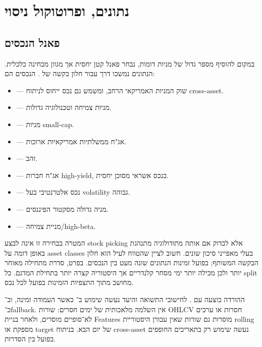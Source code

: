 \section{נתונים,  ופרוטוקול ניסוי}

\subsection{פאנל הנכסים}

במקום להוסיף מספר גדול של מניות דומות, נבחר פאנל קטן יחסית אך מגוון מבחינה כלכלית. הנתונים נמשכו דרך  \cite{yfinance} עבור חלון בקשה של . הנכסים הם:

\begin{itemize}
    \item {} — שוק המניות האמריקאי הרחב, ומשמש גם נכס ייחוס לניתוח cross-asset.
    \item {} — מניות צמיחה וטכנולוגיה גדולות.
    \item {} — מניות small-cap.
    \item {} — אג"ח ממשלתיות אמריקאיות ארוכות.
    \item {} — זהב.
    \item {} — אג"ח חברות high-yield, כנכס אשראי מסוכן יחסית.
    \item {} — נכס אלטרנטיבי בעל volatility גבוהה.
    \item {} — מניה גדולה מסקטור הפיננסים.
    \item {} — מניית צמיחה/high-beta.
\end{itemize}

המטרה בבחירה זו אינה לבצע stock picking אלא לבדוק אם אותה מתודולוגיה מתנהגת באופן דומה על asset classes בעלי מאפייני סיכון שונים. חשוב לציין שהטווח לעיל הוא חלון הבקשה המשותף; בפועל זמינות הנתונים שונה מעט בין הנכסים. בפרט, סדרת  מתחילה מאוחר יותר ולכן מכילה יותר ימי מסחר קלנדריים אך היסטוריה קצרה יותר בתחילת המדגם. כל split מחושב מתוך התצפיות הזמינות בפועל לכל נכס.

ההורדה בוצעה עם . לחישובי התשואה והיעד נעשה שימוש ב־ כאשר העמודה זמינה, וב־ כ־fallback. אין השלמה מלאכותית של ימים חסרים: שורות OHLCV חסרות או ערכים לא־סופיים מוסרים, ולאחר בניית Features מוסרות גם שורות שאין עבורן היסטוריית rolling מספקת או target של יום הבא. בניתוח cross-asset נעשה שימוש רק בתאריכים החופפים בפועל בין הסדרות.

\subsection{}

